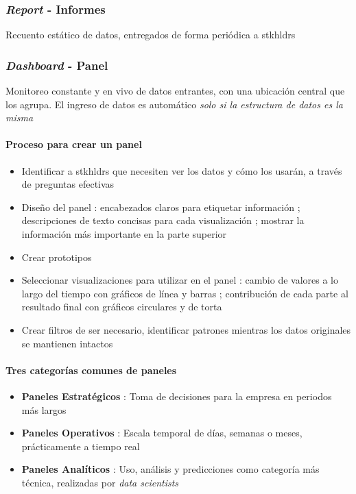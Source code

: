 \subsubsection{\textit{Report} - Informes}
Recuento estático de datos, entregados de forma periódica a \Gls{stkhldrs}

\subsubsection{\textit{Dashboard} - Panel}
Monitoreo constante y en vivo de datos entrantes, con una ubicación central que los agrupa. El ingreso de datos es automático \textit{solo si la estructura de datos es la misma}
\paragraph{Proceso para crear un panel}
    \begin{itemize}
        \item {Identificar a \Gls{stkhldrs} que necesiten ver los datos y cómo los usarán, a través de preguntas efectivas}
        \item {Diseño del panel : encabezados claros para etiquetar información ; descripciones de texto concisas para cada visualización ; mostrar la información más importante en la parte superior}
        \item {Crear prototipos}
        \item {Seleccionar visualizaciones para utilizar en el panel : cambio de valores a lo largo del tiempo con gráficos de línea y barras ; contribución de cada parte al resultado final con gráficos circulares y de torta}
        \item {Crear filtros de ser necesario, identificar patrones mientras los datos originales se mantienen intactos}
    \end{itemize}
\paragraph{Tres categorías comunes de paneles}
    \begin{itemize}
        \item {\textbf{Paneles Estratégicos} : Toma de decisiones para la empresa en periodos más largos}
        \item {\textbf{Paneles Operativos} : Escala temporal de días, semanas o meses, prácticamente a tiempo real}
        \item {\textbf{Paneles Analíticos} : Uso, análisis y predicciones como categoría más técnica, realizadas por \textit{data scientists}}
    \end{itemize}

